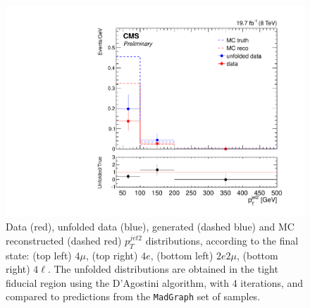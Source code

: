 \begin{figure}[hbtp]
\begin{center}
    \includegraphics[width=\cmsFigWidth]{Figures/PtJet2_ZZTo4l_Mad_fr}       
    \caption{\footnotesize{Data (red), unfolded data (blue), generated (dashed blue) and MC reconstructed (dashed red) $p_{T}^{jet2}$ distributions, according to the final state: (top left) $4\mu$, (top right) $4e$, (bottom left) $2e2\mu$, (bottom right) $4\ell$. The unfolded distributions are obtained in the tight fiducial region using the D'Agostini algorithm, with 4 iterations, and compared to predictions from the \texttt{MadGraph} set of samples.}} 
    \label{fig:PtJet2_unfolding}
  \end{center}
\end{figure}


